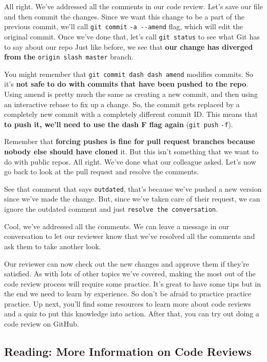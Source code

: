 	All right. We've addressed all the comments in our code review. Let's save our file and then commit the changes. Since we want this change to be a part of the previous commit, we'll call \texttt{git commit} \verb|-a --amend| flag, which will edit the original commit. Once we've done that, let's call \texttt{git status} to see what Git has to say about our repo Just like before, we see that \textbf{our change has diverged from the} \texttt{origin slash master} branch. 
	
	You might remember that \texttt{git commit dash dash amend} modifies commits. So it's \textbf{not safe to do with commits that have been pushed to the repo}. Using amend is pretty much the same as creating a new commit, and then using an interactive rebase to fix up a change. So, the commit gets replaced by a completely new commit with a completely different commit ID. This means that \textbf{to push it, we'll need to use the dash F flag again} (\texttt{git push} \verb|-f|).
	
	Remember that \textbf{forcing pushes is fine for pull request branches because nobody else should have cloned} it. But this isn't something that we want to do with public repos. All right. We've done what our colleague asked. Let's now go back to look at the pull request and resolve the comments.
	
	See that comment that says \texttt{outdated}, that's because we've pushed a new version since we've made the change. But, since we've taken care of their request, we can ignore the outdated comment and just \texttt{resolve the conversation}.
	
	Cool, we've addressed all the comments. We can leave a message in our conversation to let our reviewer know that we've resolved all the comments and ask them to take another look.
	
	Our reviewer can now check out the new changes and approve them if they're satisfied. As with lots of other topics we've covered, making the most out of the code review process will require some practice. It's great to have some tips but in the end we need to learn by experience. So don't be afraid to practice practice practice. Up next, you'll find some resources to learn more about code reviews and a quiz to put this knowledge into action. After that, you can try out doing a code review on GitHub.
	
	\subsection{Reading: More Information on Code Reviews}
	
